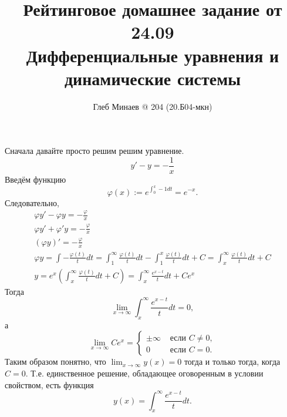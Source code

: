 \documentclass[12pt,a4paper]{article}
\title{Рейтинговое домашнее задание от 24.09\\Дифференциальные уравнения и динамические системы}
\author{Глеб Минаев @ 204 (20.Б04-мкн)}
\date{}
\begin{document}
    \maketitle

    \begin{problem}{3}
        Сначала давайте просто решим решим уравнение.
        \[y' - y = - \frac{1}{x}\]
        Введём функцию
        \[\varphi(x) := e^{\int_0^x -1 dt} = e^{-x}.\]
        Следовательно,
        \begin{gather*}
            \varphi y' - \varphi y = - \frac{\varphi}{x}\\
            \varphi y' + \varphi' y = - \frac{\varphi}{x}\\
            (\varphi y)' = - \frac{\varphi}{x}\\
            \varphi y = \int -\frac{\varphi(t)}{t} dt = \int_1^{\infty} \frac{\varphi(t)}{t} dt - \int_1^x \frac{\varphi(t)}{t} dt + C = \int_x^{\infty} \frac{\varphi(t)}{t} dt + C\\
            y = e^x \left(\int_x^{\infty} \frac{\varphi(t)}{t} dt + C\right) = \int_x^{\infty} \frac{e^{x - t}}{t} dt + C e^x
        \end{gather*}
        Тогда
        \[\lim_{x \to \infty} \int_x^{\infty} \frac{e^{x - t}}{t} dt = 0,\]
        а
        \[
            \lim_{x \to \infty} C e^x =
            \begin{cases}
                \pm \infty& \text{ если } C \neq 0,\\
                0& \text{ если } C = 0.
            \end{cases}
        \]
        Таким образом понятно, что $\lim_{x \to \infty} y(x) = 0$ тогда и только тогда, когда $C = 0$. Т.е. единственное решение, обладающее оговоренным в условии свойством, есть функция
        \[y(x) = \int_x^{\infty} \frac{e^{x - t}}{t} dt.\]
    \end{problem}
\end{document}
